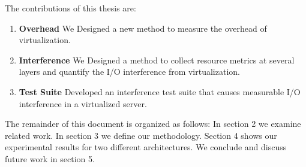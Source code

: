 \noindent
The contributions of this thesis are:
\begin{enumerate}
\item \textbf{Overhead} We Designed a new method to measure the overhead of virtualization.
\item \textbf{Interference} We Designed a method to collect resource metrics at several layers and quantify the I/O interference from virtualization.
\item \textbf{Test Suite} Developed an interference test suite that causes measurable I/O interference in a virtualized server.
\end{enumerate}

The remainder of this document is organized as follows:  In section 2 we examine related work.  In section 3 we define our methodology.  Section 4 shows our experimental results for two different architectures.   We conclude and discuss future work in section 5.

